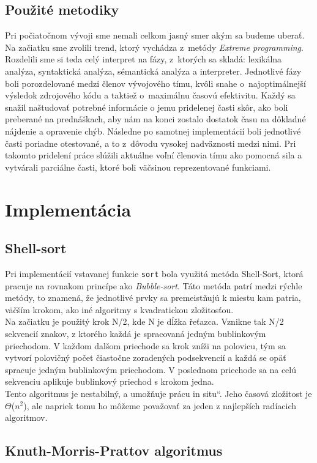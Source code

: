 \documentclass[12pt,a4paper,titlepage,final]{article}
\newcommand{\uv}[1]{\quotedblbase #1\textquotedblleft}
\begin{document}
\subsection{Použité metodiky}
Pri počiatočnom vývoji sme nemali celkom jasný smer akým sa budeme uberať. Na začiatku sme zvolili trend, ktorý vychádza z~metódy \emph{Extreme programming}. 
Rozdelili sme si teda celý interpret na fázy, z~ktorých sa skladá: lexikálna analýza, syntaktická analýza, sémantická analýza a interpreter. Jednotlivé fázy boli porozdelované medzi členov vývojového tímu, kvôli snahe o~najoptimálnejší výsledok zdrojového kódu a taktiež o~maximálnu časovú efektivitu. Každý sa snažil naštudovať potrebné informácie o jemu pridelenej časti skôr, ako boli preberané na prednáškach, aby nám na konci zostalo dostatok času na dôkladné nájdenie a opravenie chýb. Následne po samotnej implementácií boli jednotlivé časti poriadne otestované, a to z~dôvodu vysokej nadväznosti medzi nimi. Pri takomto pridelení práce slúžili aktuálne voľní členovia tímu ako pomocná sila a vytvárali parciálne časti, ktoré boli väčsinou reprezentované funkciami.
\newpage

\section{Implementácia}
\subsection{Shell-sort}
Pri implementácií vstavanej funkcie \texttt{sort} bola využitá metóda Shell-Sort, ktorá pracuje na rovnakom princípe ako \emph{Bubble-sort}\cite{Honzik:Algoritmy}. Táto metóda patrí medzi rýchle metódy, to znamená, že jednotlivé prvky sa premeistňujú k miestu kam patria, väčším krokom, ako iné algoritmy s kvadratickou zložitosťou.\\
Na začiatku je použitý krok N/2, kde N je dĺžka řeťazca. Vznikne tak N/2 sekvencií znakov, z ktorého každá je spracovaná jedným bublinkovým priechodom. V každom dalšom priechode sa krok zníži na polovicu, tým sa vytvorí polovičný počet čiastočne zoradených podsekvencií a každá se opäť spracuje jedným bublinkovým priechodom. V poslednom priechode sa na celú sekvenciu aplikuje bublinkový priechod s krokom jedna.\\
Tento algoritmus je nestabilný, a umožňuje prácu \uv{in situ}. Jeho časová zložitost je $\Theta$($n^2$), ale napriek tomu ho môžeme považovať za jeden z najlepších radíacich algoritmov.


\subsection{Knuth-Morris-Prattov algoritmus}
\end{document}
